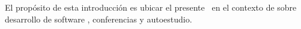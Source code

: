 
\begynd
\pind El propósito de esta introducción es ubicar el presente \manual\
\pind en el contexto de  
      \cite{TheSEBook1,TheSEBook2,TheSEBook3} sobre desarrollo de software 
\pind , conferencias y auto\ysf{-}estudio.
\afslut

\label{chap:Introduction.n}

